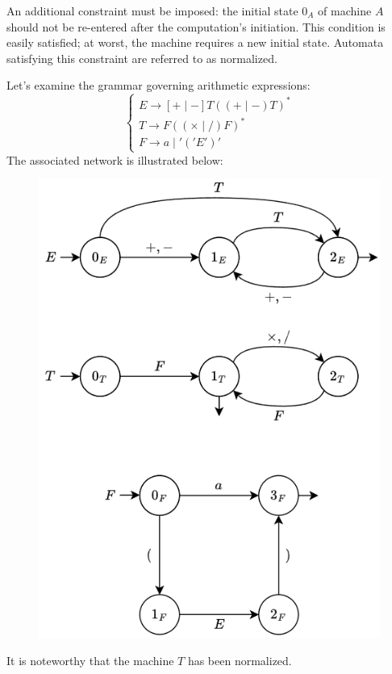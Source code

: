 An additional constraint must be imposed: the initial state $0_A$ of machine $A$ should not be re-entered after the computation's initiation.
This condition is easily satisfied; at worst, the machine requires a new initial state.
Automata satisfying this constraint are referred to as normalized.
\begin{example}
    Let's examine the grammar governing arithmetic expressions:
    \[\begin{cases}
        E \rightarrow [+\mid -]T((+\mid -)T)^{\ast} \\
        T \rightarrow F((\times\mid /)F)^{\ast} \\
        F \rightarrow a \mid  '('E')'
    \end{cases}\]   
    The associated network is illustrated below:
    \begin{figure}[H]
        \centering
        \includegraphics[width=0.4\linewidth]{images/net.png}
    \end{figure}
    It is noteworthy that the machine $T$ has been normalized.
\end{example}


